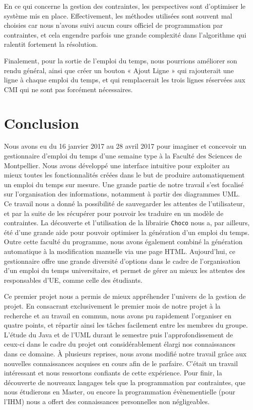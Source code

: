 \documentclass[12pt,a4paper]{article}
\begin{document}
En ce qui concerne la gestion des contraintes, les perspectives sont d'optimiser le système mis en place. Effectivement, les méthodes utilisées sont souvent mal choisies car nous n'avons suivi aucun cours officiel de programmation par contraintes, et cela engendre parfois une grande complexité dans l'algorithme qui ralentit fortement la résolution.

Finalement, pour la sortie de l’emploi du temps, nous pourrions améliorer son rendu général, ainsi que créer un bouton « Ajout Ligne » qui rajouterait une ligne à chaque emploi du temps, et qui remplacerait les trois lignes réservées aux CMI qui ne sont pas forcément nécessaires. 

\newpage
\section{Conclusion}

Nous avons eu du 16 janvier 2017 au 28 avril 2017 pour imaginer et concevoir un gestionnaire d'emploi du temps d'une semaine type à la Faculté des Sciences de Montpellier. Nous avons développé une interface intuitive pour exploiter au mieux toutes les fonctionnalités créées dans le but de produire automatiquement un emploi du temps sur mesure. Une grande partie de notre travail s'est focalisé sur l'organisation des informations, notamment à partir des diagrammes UML. Ce travail nous a donné la possibilité de sauvegarder les attentes de l'utilisateur, et par la suite de les récupérer pour pouvoir les traduire en un modèle de contraintes. La découverte et l'utilisation de la librairie \texttt{Choco} nous a, par ailleurs, été d'une grande aide pour pouvoir optimiser la génération d'un emploi du temps. Outre cette faculté du programme, nous avons également combiné la génération automatique à la modification manuelle via une page HTML. Aujourd'hui, ce gestionnaire offre une grande diversité d'options dans le cadre de l'organisation d'un emploi du temps universitaire, et permet de gérer au mieux les attentes des responsables d'UE, comme celle des étudiants.

Ce premier projet nous a permis de mieux appréhender l'univers de la gestion de projet. En consacrant exclusivement le premier mois de notre projet à la recherche et au travail en commun, nous avons pu rapidement l'organiser en quatre points, et répartir ainsi les tâches facilement entre les membres du groupe. L'étude du Java et de l'UML durant le semestre puis l'approfondissement de ceux-ci dans le cadre du projet ont considérablement élargi nos connaissances dans ce domaine. À plusieurs reprises, nous avons modifié notre travail grâce aux nouvelles connaissances acquises en cours afin de le parfaire. C'était un travail intéressant et nous ressortons confiants de cette expérience. Pour finir, la découverte de nouveaux langages tels que la programmation par contraintes, que nous étudierons en Master, ou encore la programmation évènementielle (pour l'IHM) nous a offert des connaissances personnelles non négligeables.
\newpage
\end{document}
